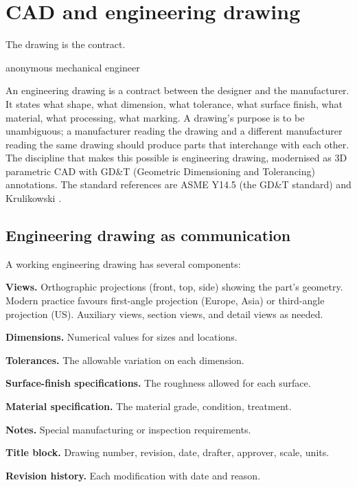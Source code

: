 \chapter{CAD and engineering drawing}
\label{vol08:ch05}

\epigraph{The drawing is the contract.}{anonymous mechanical engineer}


\noindent
An engineering drawing is a contract between the designer and the manufacturer. It states what shape, what dimension, what tolerance, what surface finish, what material, what processing, what marking. A drawing's purpose is to be unambiguous; a manufacturer reading the drawing and a different manufacturer reading the same drawing should produce parts that interchange with each other. The discipline that makes this possible is engineering drawing, modernised as 3D parametric CAD with GD\&T (Geometric Dimensioning and Tolerancing) annotations. The standard references are ASME Y14.5 (the GD\&T standard) and Krulikowski \cite{text:krulikowski-gdt}.

\section{Engineering drawing as communication}

A working engineering drawing has several components:

\textbf{Views.} Orthographic projections (front, top, side) showing the part's geometry. Modern practice favours first-angle projection (Europe, Asia) or third-angle projection (US). Auxiliary views, section views, and detail views as needed.

\textbf{Dimensions.} Numerical values for sizes and locations.

\textbf{Tolerances.} The allowable variation on each dimension.

\textbf{Surface-finish specifications.} The roughness allowed for each surface.

\textbf{Material specification.} The material grade, condition, treatment.

\textbf{Notes.} Special manufacturing or inspection requirements.

\textbf{Title block.} Drawing number, revision, date, drafter, approver, scale, units.

\textbf{Revision history.} Each modification with date and reason.


